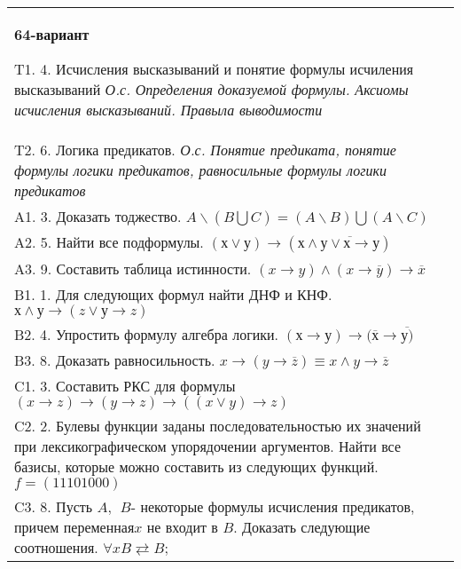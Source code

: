 \documentclass{article}
\begin{document}
\begin{tabular}{m{17cm}}
\textbf{64-вариант}
\newline

T1. 4. Исчисления высказываний и понятие формулы исчиления высказываний \emph{О.с. Определения доказуемой формулы. Аксиомы исчисления высказываний. Правыла выводимости} \\
T2. 6. Логика предикатов. \emph{О.с. Понятие предиката, понятие формулы логики предикатов, равносильные формулы логики предикатов} \\
A1. 3. Доказать тоджество. \(A\backslash(B\bigcup C) = (A\backslash B)\bigcup(A\backslash C)\) \\
A2. 5. Найти все подформулы. \((х \vee у) \rightarrow \left( х \land \overline{у \vee х \rightarrow у} \right)\) \\
A3. 9. Составить таблица истинности. \((x \rightarrow y) \land (x \rightarrow \overline{y}) \rightarrow \overline{x}\) \\
B1. 1. Для следующих формул найти ДНФ и КНФ. \(х \land у \rightarrow (z \vee у \rightarrow z)\) \\
B2. 4. Упростить формулу алгебра логики. \((х \rightarrow у) \rightarrow (\overline{х} \rightarrow \overline{у)}\) \\
B3. 8. Доказать равносильность. \(x \rightarrow \left( y \rightarrow \overline{z} \right) \equiv x \land y \rightarrow \overline{z}\) \\
C1. 3. Составить РКС для формулы \((x \rightarrow z) \rightarrow (y \rightarrow z) \rightarrow ((x \vee y) \rightarrow z)\) \\
C2. 2. Булевы функции заданы последовательностью их значений при лексикографическом упорядочении аргументов. Найти все базисы, которые можно составить из следующих функций. \(f = (11101000)\) \\
C3. 8. Пусть \(A,\ \ B\)- некоторые формулы исчисления предикатов, причем переменная\(x\) не входит в \(B\). Доказать следующие соотношения. \(\forall xB \rightleftarrows B\); \\

\end{tabular}
\vspace{1cm}
\end{document}
